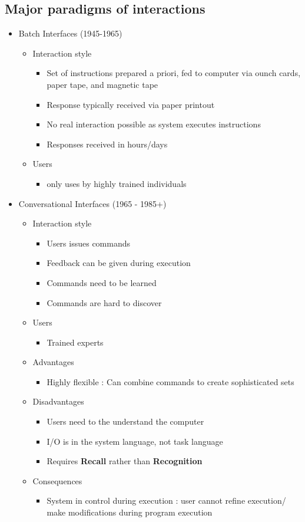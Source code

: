 \documentclass[twoside]{article}
\begin{document}
\subsection{Major paradigms of interactions}
\begin{itemize}
\item Batch Interfaces (1945-1965)
\begin{itemize}
\item Interaction style
\begin{itemize}
\item Set of instructions prepared a priori, fed to computer via ounch cards, paper tape, and magnetic tape
\item Response typically received via paper printout
\item No real interaction possible as system executes instructions
\item Responses received in hours/days
\end{itemize}
\item Users
\begin{itemize}
\item only uses by highly trained individuals
\end{itemize}
\end{itemize}
\item Conversational Interfaces (1965 - 1985+) 
\begin{itemize}
\item Interaction style
\begin{itemize}
\item Users issues commands
\item Feedback can be given during execution
\item Commands need to be learned 
\item Commands are hard to discover
\end{itemize}
\item Users
\begin{itemize}
\item Trained experts
\end{itemize}
\item Advantages 
\begin{itemize}
\item Highly flexible : Can combine commands to create sophisticated sets
\end{itemize}
\item Disadvantages
\begin{itemize}
\item Users need to the understand the computer 
\item I/O is in the system language, not task language
\item Requires \textbf{Recall} rather than \textbf{Recognition}
\end{itemize}
\item Consequences
\begin{itemize}
\item System in control during execution : user cannot refine execution/ make modifications during program execution
\end{itemize}
\end{itemize}


\end{itemize}
\end{document}
